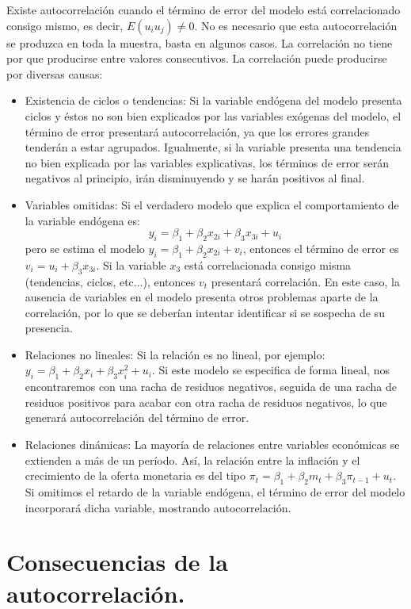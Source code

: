 Existe autocorrelaci\'on cuando el t\'ermino de error del modelo est\'a
correlacionado consigo mismo, es decir, $E\left(u_{i}u_{j}\right)\neq0$.
No es necesario que esta autocorrelaci\'on se produzca en toda la muestra,
basta en algunos casos. La correlaci\'on no tiene por que producirse
entre valores consecutivos. La correlaci\'on puede producirse por diversas
causas:
\begin{itemize}
\item Existencia de ciclos o tendencias: Si la variable end\'ogena del modelo
presenta ciclos y \'estos no son bien explicados por las variables ex\'ogenas
del modelo, el t\'ermino de error presentar\'a autocorrelaci\'on, ya que
los errores grandes tender\'an a estar agrupados. Igualmente, si la
variable presenta una tendencia no bien explicada por las variables
explicativas, los t\'erminos de error ser\'an negativos al principio,
ir\'an disminuyendo y se har\'an positivos al final.
\item Variables omitidas: Si el verdadero modelo que explica el comportamiento
de la variable end\'ogena es:
\[
y_{i}=\beta_{1}+\beta_{2}x_{2i}+\beta_{3}x_{3i}+u_{i}
\]
pero se estima el modelo $y_{i}=\beta_{1}+\beta_{2}x_{2i}+v_{i}$,
entonces el t\'ermino de error es $v_{i}=u_{i}+\beta_{3}x_{3i}$. Si
la variable $x_{3}$ est\'a correlacionada consigo misma (tendencias,
ciclos, etc...), entonces $v_{t}$ presentar\'a correlaci\'on. En este
caso, la ausencia de variables en el modelo presenta otros problemas
aparte de la correlaci\'on, por lo que se deber\'ian intentar identificar
si se sospecha de su presencia.
\item Relaciones no lineales: Si la relaci\'on es no lineal, por ejemplo:
$y_{i}=\beta_{1}+\beta_{2}x_{i}+\beta_{3}x_{i}^{2}+u_{i}$. Si este
modelo se especifica de forma lineal, nos encontraremos con una racha
de residuos negativos, seguida de una racha de residuos positivos
para acabar con otra racha de residuos negativos, lo que generar\'a
autocorrelaci\'on del t\'ermino de error.
\item Relaciones din\'amicas: La mayor\'ia de relaciones entre variables econ\'omicas
se extienden a m\'as de un per\'iodo. As\'i, la relaci\'on entre la inflaci\'on
y el crecimiento de la oferta monetaria es del tipo $\pi_{t}=\beta_{1}+\beta_{2}m_{t}+\beta_{3}\pi_{t-1}+u_{t}$.
Si omitimos el retardo de la variable end\'ogena, el t\'ermino de error
del modelo incorporar\'a dicha variable, mostrando autocorrelaci\'on.
\end{itemize}

\section{Consecuencias de la autocorrelaci\'on.}

